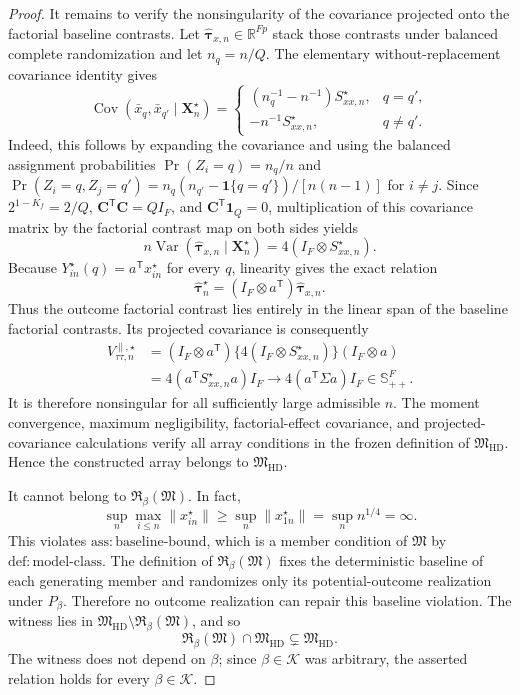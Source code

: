 \documentclass{article}
\begin{document}
\begin{proof}
It remains to verify the nonsingularity of the covariance projected onto
the factorial baseline contrasts.  Let
\(\widehat{\boldsymbol\tau}_{x,n}\in\mathbb R^{Fp}\) stack those contrasts
under balanced complete randomization and let \(n_q=n/Q\).  The elementary
without-replacement covariance identity gives
\[
\operatorname{Cov}(\bar x_q,\bar x_{q'}\mid\mathbf X_n^{\star})
=\begin{cases}
(n_q^{-1}-n^{-1})S_{xx,n}^{\star},&q=q',\\
-n^{-1}S_{xx,n}^{\star},&q\ne q'.
\end{cases}
\]
Indeed, this follows by expanding the covariance and using the balanced
assignment probabilities
\(\Pr(Z_i=q)=n_q/n\) and
\(\Pr(Z_i=q,Z_j=q')=n_q(n_{q'}-\mathbf 1\{q=q'\})/[n(n-1)]\) for
\(i\ne j\).  Since \(2^{1-K_f}=2/Q\),
\(\mathbf C^{\mathsf T}\mathbf C=QI_F\), and
\(\mathbf C^{\mathsf T}\mathbf 1_Q=0\), multiplication of this covariance
matrix by the factorial contrast map on both sides yields
\[
n\operatorname{Var}
 (\widehat{\boldsymbol\tau}_{x,n}\mid\mathbf X_n^{\star})
=4(I_F\otimes S_{xx,n}^{\star}).
\]
Because \(Y_{in}^{\star}(q)=a^{\mathsf T}x_{in}^{\star}\) for every
\(q\), linearity gives the exact relation
\[
\widehat{\boldsymbol\tau}_n^{\star}
=(I_F\otimes a^{\mathsf T})
  \widehat{\boldsymbol\tau}_{x,n}.
\]
Thus the outcome factorial contrast lies entirely in the linear span of the
baseline factorial contrasts.  Its projected covariance is consequently
\[
\begin{aligned}
V_{\tau\tau,n}^{\parallel,\star}
&=(I_F\otimes a^{\mathsf T})
  \{4(I_F\otimes S_{xx,n}^{\star})\}
  (I_F\otimes a)\\
&=4(a^{\mathsf T}S_{xx,n}^{\star}a)I_F
 \longrightarrow4(a^{\mathsf T}\Sigma a)I_F\in\mathbb S_{++}^F.
\end{aligned}
\]
It is therefore nonsingular for all sufficiently large admissible \(n\).
The moment convergence, maximum negligibility, factorial-effect covariance,
and projected-covariance calculations verify all array conditions in the
frozen definition of \(\mathfrak M_{\mathrm{HD}}\).  Hence the constructed
array belongs to \(\mathfrak M_{\mathrm{HD}}\).

It cannot belong to \(\mathfrak R_\beta(\mathfrak M)\).  In fact,
\[
\sup_n\max_{i\le n}\lVert x_{in}^{\star}\rVert
\ge\sup_n\lVert x_{1n}^{\star}\rVert
=\sup_n n^{1/4}=\infty.
\]
This violates \(\mathrm{ass{:}baseline\text{-}bound}\), which is a member
condition of \(\mathfrak M\) by \(\mathrm{def{:}model\text{-}class}\).
The definition of \(\mathfrak R_\beta(\mathfrak M)\) fixes the deterministic
baseline of each generating member and randomizes only its potential-outcome
realization under \(P_\beta\).  Therefore no outcome realization can repair
this baseline violation.  The witness lies in
\(\mathfrak M_{\mathrm{HD}}\setminus\mathfrak R_\beta(\mathfrak M)\), and so
\[
\mathfrak R_\beta(\mathfrak M)\cap\mathfrak M_{\mathrm{HD}}
\subsetneq\mathfrak M_{\mathrm{HD}}.
\]
The witness does not depend on \(\beta\); since \(\beta\in\mathcal K\) was
arbitrary, the asserted relation holds for every \(\beta\in\mathcal K\).
\end{proof}
\end{document}
